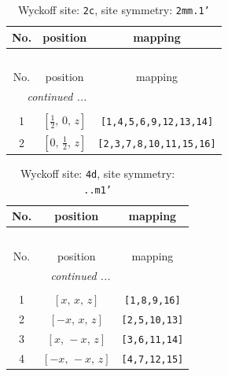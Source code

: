 \documentclass[fleqn,8pt]{jsarticle}
\begin{document}
\begin{longtable}{ccc}
\caption{Wyckoff site: {\tt 2c}, site symmetry: {\tt 2mm.1'}}
 \\
 \hline \hline
No. & position & mapping \\ \hline \endfirsthead

\multicolumn{2}{l}{\tablename\ \thetable{}} \\
 \hline \hline
No. & position & mapping \\ \hline \endhead

 \hline \hline
\multicolumn{2}{r}{\footnotesize\it continued ...} \\ \endfoot

 \hline \hline
\multicolumn{2}{r}{} \\ \endlastfoot

1 & $\left[ \frac{1}{2},\, 0,\, z \right]$ & {\tt [1,4,5,6,9,12,13,14]} \\ \hline
2 & $\left[ 0,\, \frac{1}{2},\, z \right]$ & {\tt [2,3,7,8,10,11,15,16]} \\
\end{longtable}
\renewcommand{\arraystretch}{1.2}
\begin{longtable}{ccc}
\caption{Wyckoff site: {\tt 4d}, site symmetry: {\tt ..m1'}}
 \\
 \hline \hline
No. & position & mapping \\ \hline \endfirsthead

\multicolumn{2}{l}{\tablename\ \thetable{}} \\
 \hline \hline
No. & position & mapping \\ \hline \endhead

 \hline \hline
\multicolumn{2}{r}{\footnotesize\it continued ...} \\ \endfoot

 \hline \hline
\multicolumn{2}{r}{} \\ \endlastfoot

1 & $\left[ x,\, x,\, z \right]$ & {\tt [1,8,9,16]} \\ \hline
2 & $\left[ - x,\, x,\, z \right]$ & {\tt [2,5,10,13]} \\ \hline
3 & $\left[ x,\, - x,\, z \right]$ & {\tt [3,6,11,14]} \\ \hline
4 & $\left[ - x,\, - x,\, z \right]$ & {\tt [4,7,12,15]} \\
\end{longtable}
\renewcommand{\arraystretch}{1.2}
\end{document}
